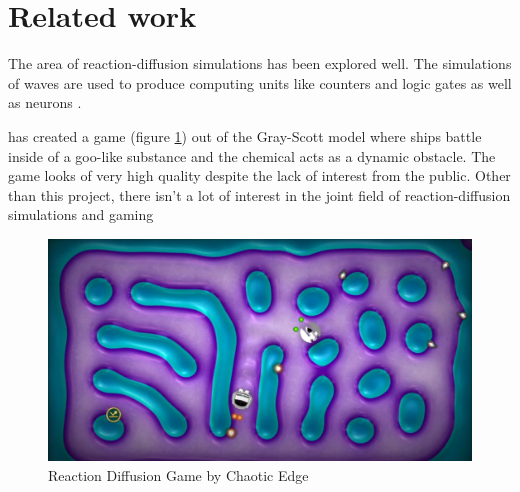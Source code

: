 \section{Related work}
The area of reaction-diffusion simulations has been explored well. The simulations of waves are used to produce computing units like counters and logic gates \citep{gorecki2003chemical} as well as neurons \citep{StovoldJames2019RaGI}. 

\cite{edge2020chaotic} has created a game (figure \ref{fig:chaotic-edge-game}) out of the Gray-Scott model where ships battle inside of a goo-like substance and the chemical acts as a dynamic obstacle. The game looks of very high quality despite the lack of interest from the public. Other than this project, there isn't a lot of interest in the joint field of reaction-diffusion simulations and gaming
\begin{figure}
    \centering
    \includegraphics[width=0.75\linewidth]{original_proposal/Screenshot 2023-10-26 at 06.06.23 (1).png}
    \caption{Reaction Diffusion Game by Chaotic Edge}
    \label{fig:chaotic-edge-game}
\end{figure}
